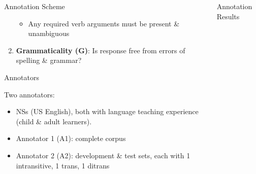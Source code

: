 \documentclass[final,14pt,t]{beamer}
\begin{document}
\begin{frame}{}
\begin{columns}[t]
\begin{column}{.33\linewidth}
\begin{minipage}[t][\textheight]{\linewidth}
\begin{block}{Annotation Scheme}
\begin{center}
\begin{minipage}{.85\textwidth}
\begin{enumerate}
\begin{itemize}
\vspace{.4em}
\item Any required verb arguments must be present \& unambiguous
\end{itemize}
\vspace{.5em}
\item \textbf{Grammaticality (G)}: Is response free from errors of spelling \& grammar?  

\end{enumerate}



\end{minipage}
\end{center}
\vspace{-.5em}
\end{block}



\begin{block}{Annotators}
\begin{center}
\begin{minipage}{.85\textwidth}
Two annotators:
\begin{itemize}
\vspace{.5em}
	\item NSs (US English), both with language teaching experience (child \& adult learners).
	\vspace{.4em}
	\item Annotator 1 (A1): complete corpus
	\vspace{.4em}
    \item Annotator 2 (A2): development \& test sets, each with 1 intransitive, 1 trans, 1 ditrans
\end{itemize}
\end{minipage}
\end{center}
\end{block}

\end{minipage}
\end{column}

\begin{column}{.33\linewidth}
\begin{minipage}[t][\textheight]{\linewidth} 
\vspace{-1.7em}
\begin{block}{Annotation Results}
\begin{center}
\begin{minipage}{.85\textwidth}


\end{minipage}
\end{center}
\end{block}
\end{minipage}
\end{column}
\end{columns}
\end{frame}
\end{document}
